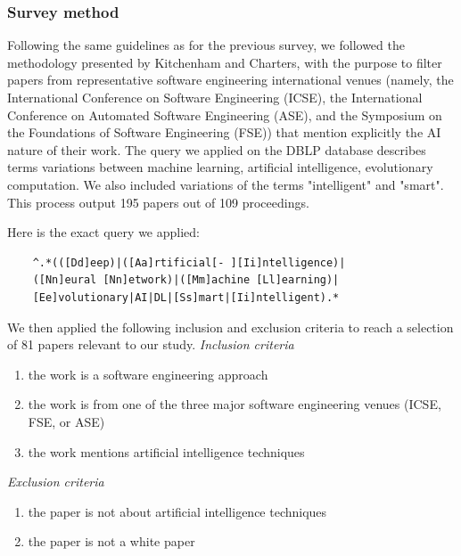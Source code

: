 
\subsubsection{Survey method}
Following the same guidelines as for the previous survey, we followed the methodology presented by Kitchenham and Charters, with the purpose to filter papers from representative software engineering international venues (namely, the International Conference on Software Engineering (ICSE), the International Conference on Automated Software Engineering (ASE), and the Symposium on the Foundations of Software Engineering (FSE)) that mention explicitly the AI nature of their work. The query we applied on the DBLP database describes terms variations between machine learning, artificial intelligence, evolutionary computation. We also included variations of the terms "intelligent" and "smart". This process output 195 papers out of 109 proceedings. 

Here is the exact query we applied:
\begin{verbatim}
	^.*(([Dd]eep)|([Aa]rtificial[- ][Ii]ntelligence)|
	([Nn]eural [Nn]etwork)|([Mm]achine [Ll]earning)|
	[Ee]volutionary|AI|DL|[Ss]mart|[Ii]ntelligent).*
\end{verbatim}

We then applied the following inclusion and exclusion criteria to reach a selection of 81 papers relevant to our study.
\textit{Inclusion criteria}
\begin{enumerate}
	\item the work is a software engineering approach
	\item the work is from one of the three major software engineering venues (ICSE, FSE, or ASE)
	\item the work mentions artificial intelligence techniques
\end{enumerate}

\textit{Exclusion criteria}
\begin{enumerate}
	\item the paper is not about artificial intelligence techniques
	\item the paper is not a white paper
\end{enumerate}

